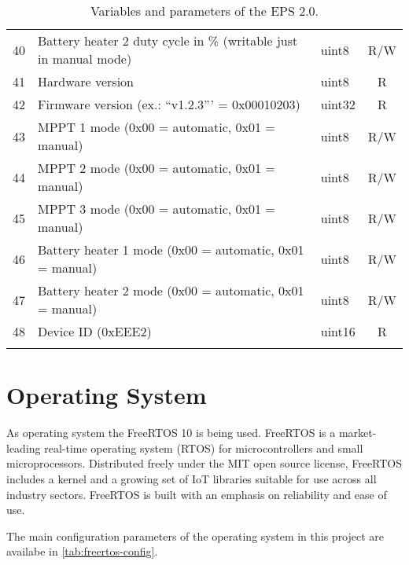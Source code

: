 \begin{longtable}[c]{cL{0.72\textwidth}lc}
    40  & Battery heater 2 duty cycle in \% (writable just in manual mode)  & uint8  & R/W \\
    41  & Hardware version                                                  & uint8  & R \\
    42  & Firmware version (ex.: ``v1.2.3''' = 0x00010203)                  & uint32 & R \\
    43  & MPPT 1 mode (0x00 = automatic, 0x01 = manual)                     & uint8  & R/W \\
    44  & MPPT 2 mode (0x00 = automatic, 0x01 = manual)                     & uint8  & R/W \\
    45  & MPPT 3 mode (0x00 = automatic, 0x01 = manual)                     & uint8  & R/W \\
    46  & Battery heater 1 mode (0x00 = automatic, 0x01 = manual)           & uint8  & R/W \\
    47  & Battery heater 2 mode (0x00 = automatic, 0x01 = manual)           & uint8  & R/W \\
    48  & Device ID (0xEEE2)                                                & uint16 & R \\
    \bottomrule[1.5pt]
    \caption{Variables and parameters of the EPS 2.0.}
    \label{tab:eps2-variables}
\end{longtable}

\section{Operating System}

As operating system the FreeRTOS 10 \cite{freertos} is being used. FreeRTOS is a market-leading real-time operating system (RTOS) for microcontrollers and small microprocessors. Distributed freely under the MIT open source license, FreeRTOS includes a kernel and a growing set of IoT libraries suitable for use across all industry sectors. FreeRTOS is built with an emphasis on reliability and ease of use.

The main configuration parameters of the operating system in this project are availabe in \autoref{tab:freertos-config}.

